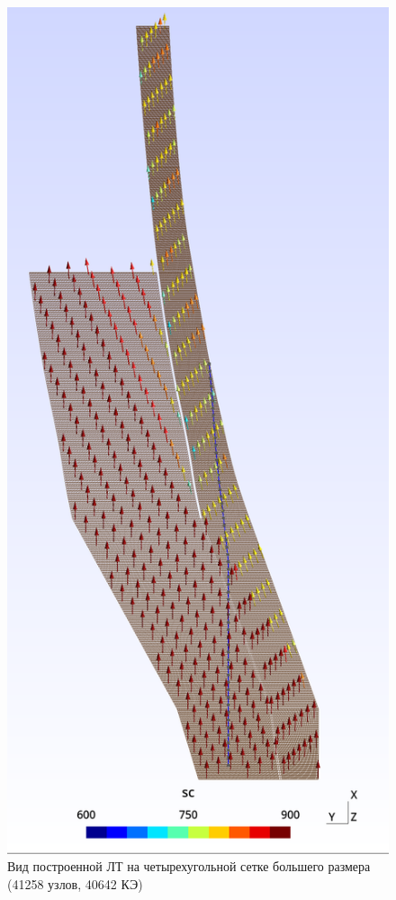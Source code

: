 \begin{figure}
	\centering
	\includegraphics[height=.9\textheight]{img/FM}
	\caption{Вид построенной ЛТ на четырехугольной сетке большего размера (41258 узлов, 40642 КЭ)}
	\label{fig:fm}
\end{figure}

